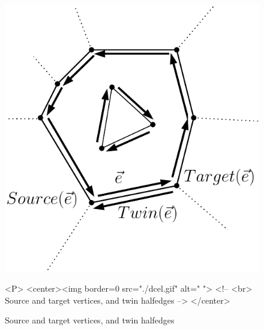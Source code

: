 \begin{figure}
\begin{ccTexOnly}
    \centerline{
       \includegraphics{Topological_map/dcel}
       }
\end{ccTexOnly}
\caption{Source and target vertices, and twin halfedges \label{fig:DCEL_ref}}

\begin{ccHtmlOnly}
<P>
<center><img border=0 src="./dcel.gif" alt=" ">
<!-- <br> Source and target vertices, and twin halfedges -->
</center>
\end{ccHtmlOnly}
\end{figure}

